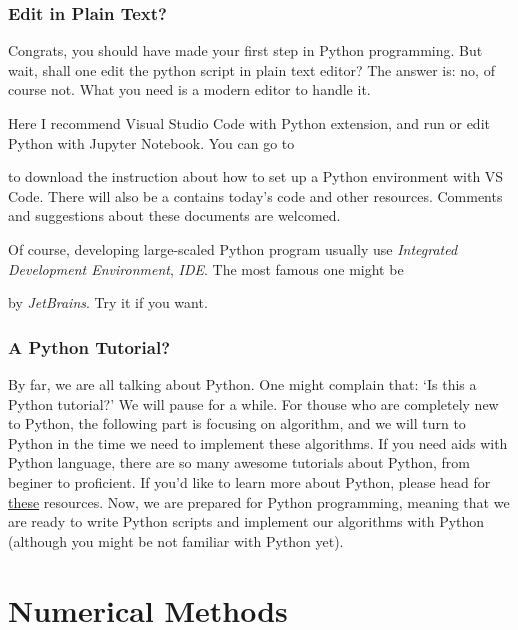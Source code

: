 \documentclass[compress,xcolor={dvipsnames}]{beamer}
\newcommand{\bhref}[2]{
    \href{#1}{\color{blue}{#2}}
}
\begin{document}
\begin{frame}
    \frametitle{Edit in Plain Text?}
    Congrats, you should have made your first step in Python programming. But wait, shall one edit the python script in plain text editor?
    The answer is: no, of course not. What you need is a modern editor to handle it.

    Here I recommend Visual Studio Code with Python
    extension, and run or edit Python with Jupyter Notebook. You can go to \bhref{https://github.com/A-moment096/Python-with-VSCode}{my Github repository}
    to download the instruction about how to set up a Python environment with VS Code. There will also be a \bhref{}{repository} contains today's code and other resources.
    Comments and suggestions about these documents are welcomed.

    Of course, developing large-scaled Python program usually use \emph{Integrated Development Environment}, \emph{IDE}. The most famous one might be
    \bhref{https://www.jetbrains.com/pycharm/}{PyCharm} by \emph{JetBrains}. Try it if you want.

\end{frame}

\begin{frame}
    \frametitle{A Python Tutorial?}
    By far, we are all talking about Python. One might complain that: `Is this a Python tutorial?'
    \bigbreak
    \pause
    We will pause for a while. For thouse who are completely new to Python, the following part is focusing on algorithm, and we will turn to Python 
    in the time we need to implement these algorithms. If you need aids with Python language, there are so many awesome tutorials about Python, 
    from beginer to proficient. If you'd like to learn more about Python, please head for \hyperlink{fm_resources}{\color{YellowGreen}these} resources.
    \bigbreak
    \pause
    Now, we are prepared for Python programming, meaning that we are
    ready to write Python scripts and implement our algorithms with Python (although you might be not familiar with Python yet).
\end{frame}
\section{Numerical Methods}
\end{document}
